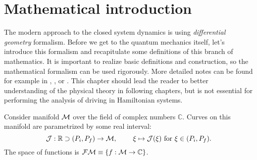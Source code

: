\chapter{Mathematical introduction}
\label{chap:mathIntro}
The modern approach to the closed system dynamics is using \emph{differential geometry} formalism. Before we get to the quantum mechanics itself, let's introduce this formalism and recapitulate some definitions of this branch of mathematics. It is important to realize basic definitions and construction, so the mathematical formalism can be used rigorously. More detailed notes can be found for example in \citet{krtous}, \citet{lu}, or \citet{fecko}. This chapter should lead the reader to better understanding of the physical theory in following chapters, but is not essential for performing the analysis of driving in Hamiltonian systems.

Consider manifold $\mathcal{M}$ over the field of complex numbers $\mathbb C$. Curves on this manifold are parametrized by some real interval:
$$\mathcal J:\mathbb{R} \supset (P_i,P_f) \rightarrow \mathcal{M},\; \qquad \xi\mapsto \mathcal J(\xi) \text{  for } \xi \in (P_i,P_f) .$$ 
The space of functions is $\mathcal{FM}\equiv\{f:\mathcal{M}\rightarrow \mathbb{C}\}$.


